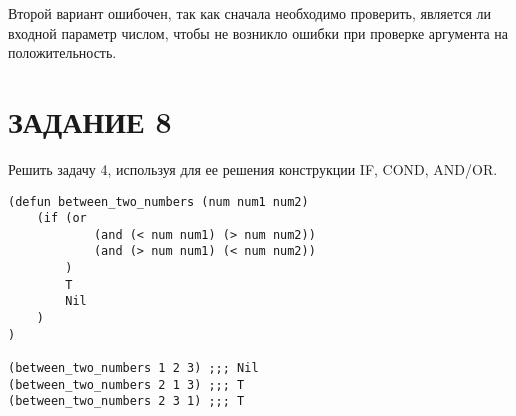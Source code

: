 Второй вариант ошибочен, так как сначала необходимо проверить,
является ли входной параметр числом, чтобы не возникло ошибки
при проверке аргумента на положительность.

\section{ЗАДАНИЕ 8}

Решить задачу 4, используя для ее решения конструкции
IF, COND, AND/OR.

\begin{lstlisting}
(defun between_two_numbers (num num1 num2)
    (if (or
            (and (< num num1) (> num num2))
            (and (> num num1) (< num num2))
        )
        T
        Nil
    )
)

(between_two_numbers 1 2 3) ;;; Nil
(between_two_numbers 2 1 3) ;;; T
(between_two_numbers 2 3 1) ;;; T
\end{lstlisting}

